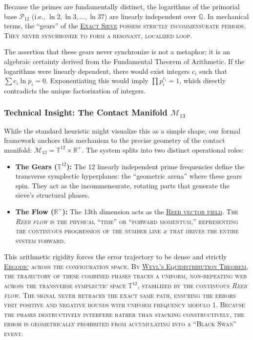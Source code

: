 \documentclass[sn-mathphys-num, pdflatex, referee]{sn-jnl}
\newcommand{\gterm}[2]{\begingroup\normalfont\scshape\hyperlink{#1}{#2}\endgroup}
\begin{document}
Because the primes are fundamentally distinct, the logarithms of the primorial base $\mathcal{P}_{12}$ (i.e., $\ln 2, \ln 3, \dots, \ln 37$) are linearly independent over $\mathbb{Q}$. In mechanical terms, the ``gears'' of the \gterm{exact_sieve}{Exact Sieve} possess strictly incommensurate periods. They never synchronize to form a resonant, localized loop. 

The assertion that these gears never synchronize is not a metaphor; it is an algebraic certainty derived from the Fundamental Theorem of Arithmetic. If the logarithms were linearly dependent, there would exist integers $c_i$ such that $\sum c_i \ln p_i = 0$. Exponentiating this would imply $\prod p_i^{c_i} = 1$, which directly contradicts the unique factorization of integers.

\subsubsection*{Technical Insight: The Contact Manifold $\mathcal{M}_{13}$}
While the standard heuristic might visualize this as a simple shape, our formal framework anchors this mechanism to the precise geometry of the contact manifold: $\mathcal{M}_{13} = \mathbb{T}^{12} \times \mathbb{R}^+$. The system splits into two distinct operational roles:
\begin{itemize}
    \item \textbf{The Gears ($\mathbb{T}^{12}$):} The 12 linearly independent prime frequencies define the transverse symplectic hyperplanes: the ``geometric arena'' where these gears spin. They act as the incommensurate, rotating parts that generate the sieve's structural phases.  
    \item \textbf{The Flow ($\mathbb{R}^+$):} The 13th dimension acts as the \gterm{reeb}{Reeb vector field}. The \textit{Reeb flow} is the physical ``time'' or ``forward momentum,'' representing the continuous progression of the number line $x$ that drives the entire system forward.
\end{itemize}

This arithmetic rigidity forces the error trajectory to be dense and strictly \gterm{ergodic}{Ergodic} across the configuration space. By \gterm{weyl}{Weyl's Equidistribution Theorem}, the trajectory of these combined phases traces a uniform, non-repeating web across the transverse symplectic space $\mathbb{T}^{12}$, stabilized by the continuous \textit{Reeb flow}. The signal never retraces the exact same path, ensuring the errors visit positive and negative bounds with uniform frequency modulo 1. Because the phases destructively interfere rather than stacking constructively, the error is geometrically prohibited from accumulating into a ``Black Swan'' event.
\end{document}
